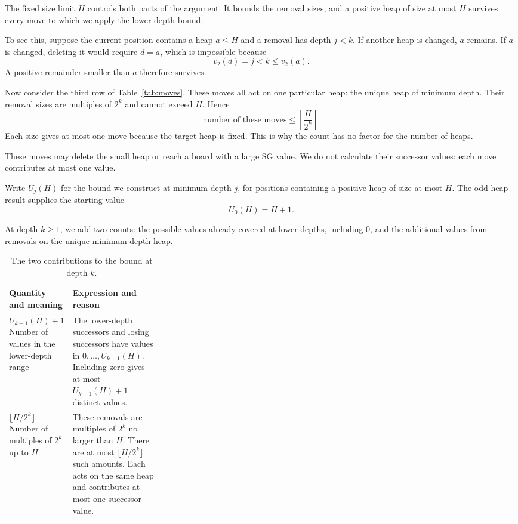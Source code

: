 \documentclass[11pt]{article}
\begin{document}
The fixed size limit $H$ controls both parts of the argument.
It bounds the removal sizes, and a positive heap of size at
most $H$ survives every move to which we apply the lower-depth
bound.

To see this, suppose the current position contains a heap
$a\le H$ and a removal has depth $j<k$. If another heap is
changed, $a$ remains. If $a$ is changed, deleting it would
require $d=a$, which is impossible because
\[
 v_2(d)=j<k\le v_2(a).
\]
A positive remainder smaller than $a$ therefore survives.

Now consider the third row of Table~\ref{tab:moves}.
These moves all act on one particular heap: the unique heap
of minimum depth. Their removal sizes are multiples of
$2^k$ and cannot exceed $H$. Hence
\begin{equation}
 \text{number of these moves}
 \le
 \left\lfloor\frac{H}{2^k}\right\rfloor.
 \label{eq:exceptioncount}
\end{equation}
Each size gives at most one move because the target heap is
fixed. This is why the count has no factor for the number
of heaps.

These moves may delete the small heap or reach a board with
a large SG value. We do not calculate their successor values:
each move contributes at most one value.

Write $U_j(H)$ for the bound we construct at minimum depth
$j$, for positions containing a positive heap of size at
most $H$. The odd-heap result supplies the starting value
\[
 U_0(H)=H+1.
\]

At depth $k\ge1$, we add two counts: the possible values already
covered at lower depths, including $0$, and the additional values
from removals on the unique minimum-depth heap.

\begin{table}[H]
\centering
\begin{tabularx}{\linewidth}{@{}L{0.30\linewidth}Y@{}}
\toprule
Quantity and meaning & Expression and reason \\
\midrule
$U_{k-1}(H)+1$\newline
Number of values in the lower-depth range
  & The lower-depth successors and losing successors have
    values in $0,\ldots,U_{k-1}(H)$. Including zero gives
    at most $U_{k-1}(H)+1$ distinct values. \\
\addlinespace[9pt]
$\lfloor H/2^k\rfloor$\newline
Number of multiples of $2^k$ up to $H$
  & These removals are multiples of $2^k$ no larger than $H$.
    There are at most $\lfloor H/2^k\rfloor$ such amounts.
    Each acts on the same heap and contributes at most one
    successor value. \\
\bottomrule
\end{tabularx}
\caption{The two contributions to the bound at depth $k$.}
\label{tab:recursionterms}
\end{table}
\end{document}
